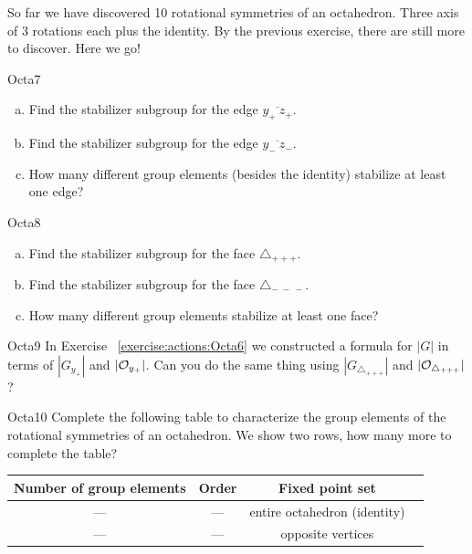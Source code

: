So far we have discovered 10 rotational symmetries of an octahedron.  Three axis of 3 rotations each plus the identity.  By the previous exercise, there are still more to discover.  Here we go! 

\begin{exercise}{Octa7}
\begin{enumerate}[(a)]
\item Find the stabilizer subgroup for the edge $\overline{y_+~z_+}$. 
\item Find the stabilizer subgroup for the edge $\overline{y_-~z_-}$.
\item How many different group elements (besides the identity) stabilize at least one edge?
\end{enumerate}
\end{exercise}	

\begin{exercise}{Octa8}
\begin{enumerate}[(a)]
\item Find the stabilizer subgroup for the face $\triangle_{+ + +}$.
\item Find the stabilizer subgroup for the face $\triangle_{ -~-~-}$.
\item How many different group elements stabilize at least one face?
\end {enumerate}
\end{exercise}

\begin{exercise}{Octa9}
In Exercise ~\ref {exercise:actions:Octa6} we constructed a formula for $|G|$ in terms of $|G_{y_+}|$ and $|{\cal O}_{y_+}|$.  Can you do the same thing using $|G_{\triangle_{+ + +}}|$ and $|{\cal O}_{\triangle_{+ + +}}|$?
\end{exercise}

\begin{exercise}{Octa10}
Complete the following table to characterize the group elements of the rotational symmetries of an octahedron.  We show two rows, how many more to complete the table? 
 
\begin{tabular}{| c |c|c| r |} \hline
 \textbf{ Number of group elements} & \textbf{Order} & \textbf{Fixed point set} \\ \hline
  ---&  ---& entire  octahedron (identity) \\ \hline
  --- & ---&  opposite vertices \\

\end{tabular}
\end{exercise}

